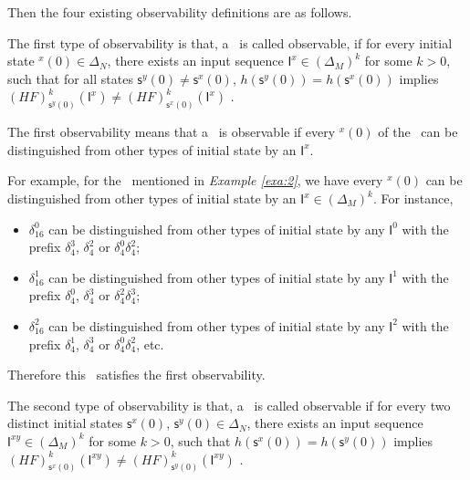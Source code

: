 Then the four existing observability definitions are as follows.

\begin{definition} 
The first type of observability is that, a \BCN\ is called observable, if for every initial state \State$^{x}(0)$$\in \Delta_N$, there exists an input sequence $\mathsf{I}^x\in(\Delta_M)^k$ for some $k>0$, such that for all states $\mathsf{s}^{y}(0)\neq \mathsf{s}^{x}(0)$, $h(\mathsf{s}^{y}(0))=h(\mathsf{s}^{x}(0))$ implies $(HF)^k_{\mathsf{s}^{y}(0)}(\mathsf{I}^x)\neq (HF)^k_{{\mathsf{s}^{x}(0)}}(\mathsf{I}^x)$ \cite{cheng2009controllability}.
\end{definition}

The first observability means that a \BCN\ is observable if every \State$^{x}(0)$ of the \BCN\ can be distinguished from other types of initial state by an $\mathsf{I}^x$. %
\begin{example}
For example, for the \BCN\ mentioned in {\em Example \ref{exa:2}}, we have every \State$^{x}(0)$ can be distinguished from other types of initial state by an $\mathsf{I}^x \in(\Delta_M)^k$.  For instance,
\begin{itemize}
  \item $\delta_{16}^0$ can be distinguished from other types of initial state by any $\mathsf{I}^0$ with the prefix $\delta_{4}^3$, $\delta_{4}^2$ or $\delta_{4}^0  \delta_{4}^2$;
  \item $\delta_{16}^1$ can be distinguished from other types of initial state by any $\mathsf{I}^1$ with the prefix $\delta_{4}^0$, $\delta_{4}^3$ or $\delta_{4}^2 \delta_{4}^3$;
  \item $\delta_{16}^2$ can be distinguished from other types of initial state by any $\mathsf{I}^2$ with the prefix $\delta_{4}^1$, $\delta_{4}^3$ or $\delta_{4}^0 \delta_{4}^2$, etc.
\end{itemize} 
Therefore this \BCN\ satisfies the first observability.
\label{exa:4}
\end{example}   

\begin{definition}
	The second type of observability is that, a \BCN\ is called observable if for every two distinct initial states $\mathsf{s}^{x}(0)$, $\mathsf{s}^{y}(0) \in \Delta_N$, there exists an input sequence $\mathsf{I}^{xy}\in(\Delta_M)^k$ for some $k>0$, such that $h(\mathsf{s}^{x}(0))=h(\mathsf{s}^{y}(0))$ implies $(HF)^k_{\mathsf{s}^{x}(0)}(\mathsf{I}^{xy})\neq (HF)^k_{\mathsf{s}^{y}(0)}(\mathsf{I}^{xy})$ \cite{Zhao2010Input}.
\end{definition}

